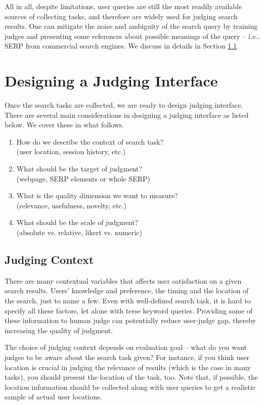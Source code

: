 \documentclass[openany]{now} %
\begin{document}
All in all, despite limitations, user queries are still the most readily available sources of collecting tasks, and therefore are widely used for judging search results. One can mitigate the noise and ambiguity of the search query by training judges and presenting some references about possible meanings of the query -- i.e., SERP from commercial search engines. We discuss in details in Section \ref{s:judging-context}.

\section{Designing a Judging Interface}

Once the search tasks are collected, we are ready to design judging interface. There are several main considerations in designing a judging interface as listed below. We cover these in what follows.

\begin{enumerate}
	\item  How do we describe the context of search task? \\(user location, session history, etc.)
	\item  What should be the target of judgment? \\(webpage, SERP elements or whole SERP)
	\item  What is the quality dimension we want to measure? \\(relevance, usefulness, novelty, etc.)
	\item  What should be the scale of judgment? \\(absolute vs. relative, likert vs. numeric)
\end{enumerate}

\subsection{Judging Context}
\label{s:judging-context}
There are many contextual variables that affects user satisfaction on a given search results. Users' knowledge and preference, the timing and the location of the search, just to name a few. Even with well-defined search task, it is hard to specify all these factors, let alone with terse keyword queries. Providing some of these information to human judge can potentially reduce user-judge gap, thereby increasing the quality of judgment. 

The choice of judging context depends on evaluation goal -- what do you want judges to be aware about the search task given? For instance, if you think user location is crucial in judging the relevance of results (which is the case in many tasks), you should present the location of the task, too. Note that, if possible, the location information should be collected along with user queries to get a realistic sample of actual user locations.
\end{document}
